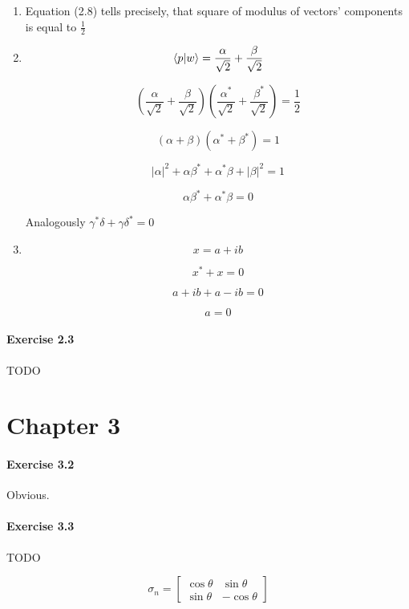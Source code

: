 \documentclass[a4paper]{article}
\begin{document}
\begin{enumerate}
    \item Equation (2.8) tells precisely, that square of modulus of vectors' components is equal to $\frac{1}{2}$
    \item
        $$
            \bra{p}\ket{w} = \frac{\alpha}{\sqrt{2}} + \frac{\beta}{\sqrt{2}}
        $$

        $$
            (\frac{\alpha}{\sqrt{2}} + \frac{\beta}{\sqrt{2}}) (\frac{\alpha^{*}}{\sqrt{2}} + \frac{\beta^{*}}{\sqrt{2}}) = \frac{1}{2}
        $$

        $$
            (\alpha + \beta) (\alpha^{*} + \beta^{*}) = 1
        $$

        $$
            |\alpha|^{2} + \alpha \beta^{*} + \alpha^{*} \beta + |\beta|^{2} = 1
        $$

        $$
            \alpha \beta^{*} + \alpha^{*} \beta = 0
        $$

        Analogously $\gamma^{*} \delta + \gamma \delta^{*} = 0$
    \item
        $$
            x = a + i b
        $$

        $$
            x^{*} + x = 0
        $$

        $$
            a + i b + a - i b = 0
        $$

        $$
            a = 0
        $$
\end{enumerate}

\paragraph{Exercise 2.3} 

TODO

\section{Chapter 3}

\paragraph{Exercise 3.2}

Obvious.

\paragraph{Exercise 3.3}

TODO

$$
    \sigma_{n} =
        \begin{bmatrix}
            \cos\theta & \sin\theta \\
            \sin\theta & -\cos\theta
        \end{bmatrix}
$$
\end{document}
